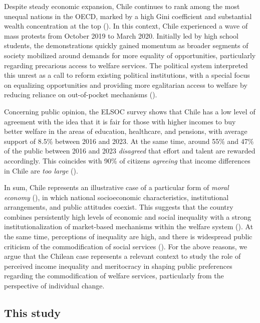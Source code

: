 \documentclass[
  12pt,
]{article}
\begin{document}
Despite steady economic expansion, Chile continues to rank among the
most unequal nations in the OECD, marked by a high Gini coefficient and
substantial wealth concentration at the top
(). In this context,
Chile experienced a wave of mass protests from October 2019 to March
2020. Initially led by high school students, the demonstrations quickly
gained momentum as broader segments of society mobilized around demands
for more equality of opportunities, particularly regarding precarious
access to welfare services. The political system interpreted this unrest
as a call to reform existing political institutions, with a special
focus on equalizing opportunities and providing more egalitarian access
to welfare by reducing reliance on out-of-pocket mechanisms
().

Concerning public opinion, the ELSOC survey shows that Chile has a low
level of agreement with the idea that it is fair for those with higher
incomes to buy better welfare in the areas of education, healthcare, and
pensions, with average support of 8.5\% between 2016 and 2023. At the
same time, around 55\% and 47\% of the public between 2016 and 2023
\emph{disagreed} that effort and talent are rewarded accordingly. This
coincides with 90\% of citizens \emph{agreeing} that income differences
in Chile are \emph{too large}
().

In sum, Chile represents an illustrative case of a particular form of
\emph{moral economy} (), in which national socioeconomic characteristics, institutional
arrangements, and public attitudes coexist. This suggests that the
country combines persistently high levels of economic and social
inequality with a strong institutionalization of market-based mechanisms
within the welfare system
(). At the same
time, perceptions of inequality are high, and there is widespread public
criticism of the commodification of social services
(). For the above
reasons, we argue that the Chilean case represents a relevant context to
study the role of perceived income inequality and meritocracy in shaping
public preferences regarding the commodification of welfare services,
particularly from the perspective of individual change.

\subsection{This study}\label{this-study}
\end{document}
